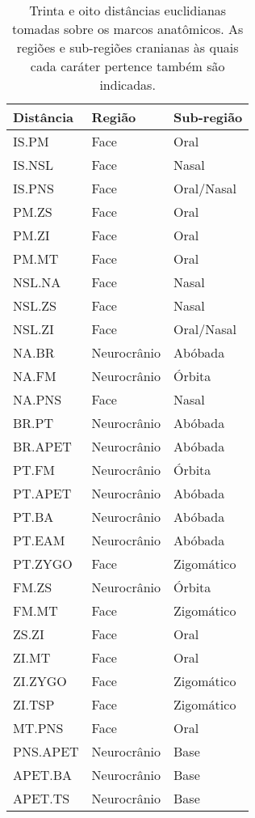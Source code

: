 \begin {table}[hp]
  \centering
  \caption {Trinta e oito distâncias euclidianas tomadas sobre os marcos anatômicos. As regiões e sub-regiões cranianas às quais cada caráter pertence também são indicadas. \label{tab:dist}}
  
  \hr
  \begin {tabularx} {\textwidth} {X X X}
    \bf{Distância} & \bf{Região} & \bf{Sub-região}  \\
    \hline
    IS.PM & Face & Oral \\
    IS.NSL & Face & Nasal \\
    IS.PNS & Face & Oral/Nasal \\
    PM.ZS & Face & Oral \\
    PM.ZI & Face & Oral \\
    PM.MT & Face & Oral \\
    NSL.NA & Face & Nasal \\
    NSL.ZS & Face & Nasal \\
    NSL.ZI & Face & Oral/Nasal \\
    NA.BR & Neurocrânio & Abóbada \\
    NA.FM & Neurocrânio & Órbita \\
    NA.PNS & Face & Nasal \\
    BR.PT & Neurocrânio & Abóbada \\
    BR.APET & Neurocrânio & Abóbada \\
    PT.FM & Neurocrânio & Órbita \\
    PT.APET & Neurocrânio & Abóbada \\
    PT.BA & Neurocrânio & Abóbada \\
    PT.EAM & Neurocrânio & Abóbada \\
    PT.ZYGO & Face & Zigomático \\
    FM.ZS & Neurocrânio & Órbita \\
    FM.MT & Face & Zigomático \\
    ZS.ZI & Face & Oral \\
    ZI.MT & Face & Oral \\
    ZI.ZYGO & Face & Zigomático \\
    ZI.TSP & Face & Zigomático \\
    MT.PNS & Face & Oral \\
    PNS.APET & Neurocrânio & Base \\
    APET.BA & Neurocrânio & Base \\
    APET.TS & Neurocrânio & Base \\

\end{tabularx}
\end{table}
